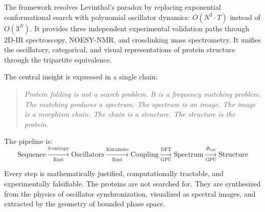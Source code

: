 \documentclass[11pt,twocolumn,a4paper]{article}
\theoremstyle{definition}
\theoremstyle{remark}
\newcommand{\morphism}{\Phi}
\begin{document}
The framework resolves Levinthal's paradox by replacing exponential conformational search with polynomial oscillator dynamics: $O(N^2 \cdot T)$ instead of $O(3^N)$. It provides three independent experimental validation paths through 2D-IR spectroscopy, NOESY-NMR, and crosslinking mass spectrometry. It unifies the oscillatory, categorical, and visual representations of protein structure through the tripartite equivalence.

The central insight is expressed in a single chain:

\begin{quote}
\emph{Protein folding is not a search problem. It is a frequency matching problem. The matching produces a spectrum. The spectrum is an image. The image is a morphism chain. The chain is a structure. The structure is the protein.}
\end{quote}

\noindent The pipeline is:
\begin{equation*}
\text{Sequence} \xrightarrow[\text{Rust}]{\text{S-entropy}} \text{Oscillators} \xrightarrow[\text{Rust}]{\text{Kuramoto}} \text{Coupling}
\xrightarrow[\text{GPU}]{\text{DFT}} \text{Spectrum} \xrightarrow[\text{GPU}]{\morphism_{\text{fold}}} \text{Structure}
\end{equation*}

Every step is mathematically justified, computationally tractable, and experimentally falsifiable. The proteins are not searched for. They are synthesized from the physics of oscillator synchronization, visualized as spectral images, and extracted by the geometry of bounded phase space.




\end{document}
